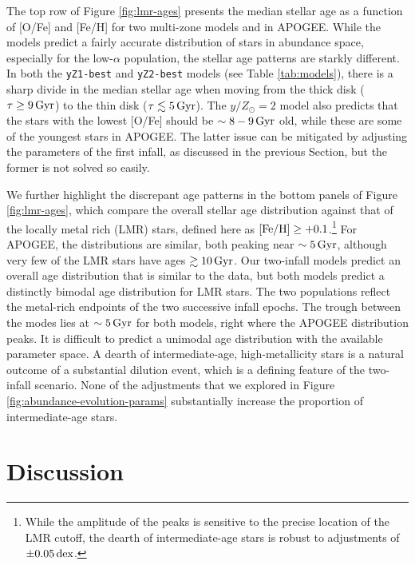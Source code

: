 \documentclass[twocolumn,twocolappendix,linenumbers]{aastex631}
\newcommand{\todo}[1]{{\color{red}#1}}
\newcommand{\mathFeH}{{\rm [Fe/H]}}
\newcommand{\yZ}[1]{$y/Z_\odot=#1$}
\newcommand{\Gyr}{\,{\rm Gyr}}
\newcommand{\dex}{\,{\rm dex}}
\begin{document}
The top row of Figure \ref{fig:lmr-ages} presents the median stellar age as a function of [O/Fe] and [Fe/H] for two multi-zone models and in APOGEE. While the models predict a fairly accurate distribution of stars in abundance space, especially for the low-$\alpha$ population, the stellar age patterns are starkly different. In both the {\tt yZ1-best} and {\tt yZ2-best} models (see Table \ref{tab:models}), there is a sharp divide in the median stellar age when moving from the thick disk ($\tau\ge9\Gyr$) to the thin disk ($\tau\lesssim5\Gyr$). The \yZ{2} model also predicts that the stars with the lowest [O/Fe] should be $\sim8-9\Gyr$ old, while these are some of the youngest stars in APOGEE. The latter issue can be mitigated by adjusting the parameters of the first infall, as discussed in the previous Section, but the former is not solved so easily.

We further highlight the discrepant age patterns in the bottom panels of Figure \ref{fig:lmr-ages}, which compare the overall stellar age distribution against that of the locally metal rich (LMR) stars, defined here as $\mathFeH\ge+0.1$.\footnote{
    While the amplitude of the peaks is sensitive to the precise location of the LMR cutoff, the dearth of intermediate-age stars is robust to adjustments of $\pm0.05\dex$.
} For APOGEE, the distributions are similar, both peaking near $\sim5\Gyr$, although very few of the LMR stars have ages $\gtrsim10\Gyr$. Our two-infall models predict an overall age distribution that is similar to the data, but both models predict a distinctly bimodal age distribution for LMR stars. The two populations reflect the metal-rich endpoints of the two successive infall epochs. The trough between the modes lies at $\sim5\Gyr$ for both models, right where the APOGEE distribution peaks. It is difficult to predict a unimodal age distribution with the available parameter space. A dearth of intermediate-age, high-metallicity stars is a natural outcome of a substantial dilution event, which is a defining feature of the two-infall scenario. None of the adjustments that we explored in Figure \ref{fig:abundance-evolution-params} substantially increase the proportion of intermediate-age stars.

\section{Discussion}
\label{sec:discussion}

\end{document}
